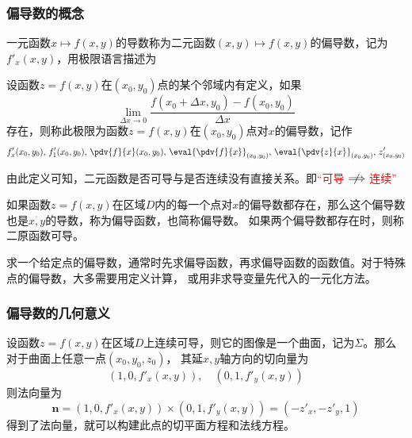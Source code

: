 \subsubsection{偏导数的概念}
一元函数$x\mapsto f(x,y)$的导数称为二元函数$(x,y)\mapsto f(x,y)$的偏导数，记为$f'_x(x,y)$，用极限语言描述为
\begin{definition}
    设函数$z=f(x,y)$在$(x_0,y_0)$点的某个邻域内有定义，如果
    \[ \lim_{\Delta x\to 0} \frac{f(x_0+\Delta x,y_0)-f(x_0,y_0)}{\Delta x} \]
    存在，则称此极限为函数$z=f(x,y)$在$(x_0,y_0)$点对$x$的偏导数，记作
    \[
        f'_x(x_0,y_0),\,
        f'_1(x_0,y_0),\,
        \pdv{f}{x}(x_0,y_0),\,
        \eval{\pdv{f}{x}}_{(x_0,y_0)},\,
        \eval{\pdv{z}{x}}_{(x_0,y_0)},\,
        z'_{(x_0,y_0)}
    \]
\end{definition}

由此定义可知，二元函数是否可导与是否连续没有直接关系。即\textcolor{red}{“可导$\centernot\implies$连续”}

如果函数$z=f(x,y)$在区域$D$内的每一个点对$x$的偏导数都存在，那么这个偏导数也是$x,y$的导数，称为偏导函数，也简称偏导数。
如果两个偏导数都存在时，则称二原函数可导。

\begin{situation}
    求一个给定点的偏导数，通常时先求偏导函数，再求偏导函数的函数值。对于特殊点的偏导数，大多需要用定义计算，
    或用非求导变量先代入的一元化方法。
\end{situation}

\subsubsection{偏导数的几何意义}
设函数$z=f(x,y)$在区域$D$上连续可导，则它的图像是一个曲面，记为$\Sigma$。那么对于曲面上任意一点$(x_0,y_0,z_0)$，
其延$x,y$轴方向的切向量为
\[ (1,0,f'_x(x,y)),\quad(0,1,f'_y(x,y)) \]
则法向量为
\begin{equation}
    \bm{n} = (1,0,f'_x(x,y)) \times (0,1,f'_y(x,y)) = (-z'_x, -z'_y, 1)
\end{equation}
得到了法向量，就可以构建此点的切平面方程和法线方程。

